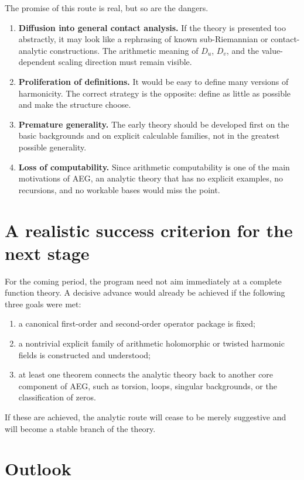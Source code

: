 \documentclass[11pt]{article}
\newcommand{\AEG}{AEG}
\begin{document}
The promise of this route is real, but so are the dangers.

\begin{enumerate}[label=(\arabic*)]
\item \textbf{Diffusion into general contact analysis.} If the theory is presented too abstractly, it may look like a rephrasing of known sub-Riemannian or contact-analytic constructions. The arithmetic meaning of $D_u$, $D_v$, and the value-dependent scaling direction must remain visible.
\item \textbf{Proliferation of definitions.} It would be easy to define many versions of harmonicity. The correct strategy is the opposite: define as little as possible and make the structure choose.
\item \textbf{Premature generality.} The early theory should be developed first on the basic backgrounds and on explicit calculable families, not in the greatest possible generality.
\item \textbf{Loss of computability.} Since arithmetic computability is one of the main motivations of \AEG{}, an analytic theory that has no explicit examples, no recursions, and no workable bases would miss the point.
\end{enumerate}

\section{A realistic success criterion for the next stage}

For the coming period, the program need not aim immediately at a complete function theory. A decisive advance would already be achieved if the following three goals were met:
\begin{enumerate}[label=(\alph*)]
\item a canonical first-order and second-order operator package is fixed;
\item a nontrivial explicit family of arithmetic holomorphic or twisted harmonic fields is constructed and understood;
\item at least one theorem connects the analytic theory back to another core component of \AEG{}, such as torsion, loops, singular backgrounds, or the classification of zeros.
\end{enumerate}

If these are achieved, the analytic route will cease to be merely suggestive and will become a stable branch of the theory.

\section{Outlook}
\end{document}

